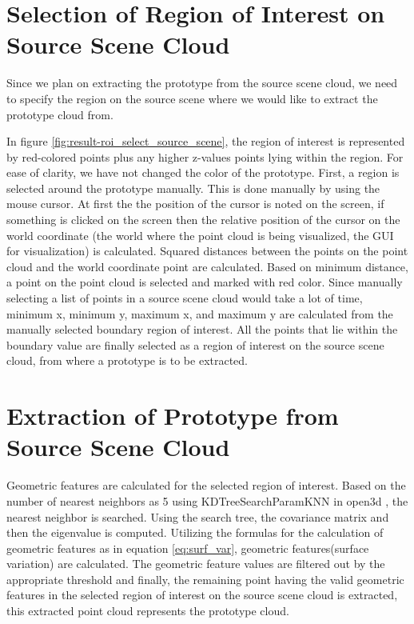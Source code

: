 \section{Selection of Region of Interest on Source Scene Cloud}
Since we plan on extracting the prototype from the source scene cloud, we need to specify the region on the source scene where we would like to extract the prototype cloud from.



In figure \ref{fig:result-roi_select_source_scene}, the region of interest is represented by red-colored points plus any higher z-values points lying within the region. For ease of clarity, we have not changed the color of the prototype. First, a region is selected around the prototype manually. This is done manually by using the mouse cursor. At first the the position of the cursor is noted on the screen, if something is clicked on the screen then the relative position of the cursor on the world coordinate (the world where the point cloud is being visualized, the GUI for visualization) is calculated. Squared distances between the points on the point cloud and the world coordinate point are calculated. Based on minimum distance, a point on the point cloud is selected and marked with red color. Since manually selecting a list of points in a source scene cloud would take a lot of time, minimum x, minimum y, maximum x, and maximum y are calculated from the manually selected boundary region of interest. All the points that lie within the boundary value are finally selected as a region of interest on the source scene cloud, from where a prototype is to be extracted.

\section{Extraction of Prototype from Source Scene Cloud}
Geometric features are calculated for the selected region of interest. Based on the number of nearest neighbors as 5 using KDTreeSearchParamKNN in open3d \parencite{open3d}, the nearest neighbor is searched. Using the search tree, the covariance matrix and then the eigenvalue is computed. Utilizing the formulas for the calculation of geometric features as in equation \ref{eq:surf_var}, geometric features(surface variation) are calculated. The geometric feature values are filtered out by the appropriate threshold and finally, the remaining point having the valid geometric features in the selected region of interest on the source scene cloud is extracted, this extracted point cloud represents the prototype cloud.

